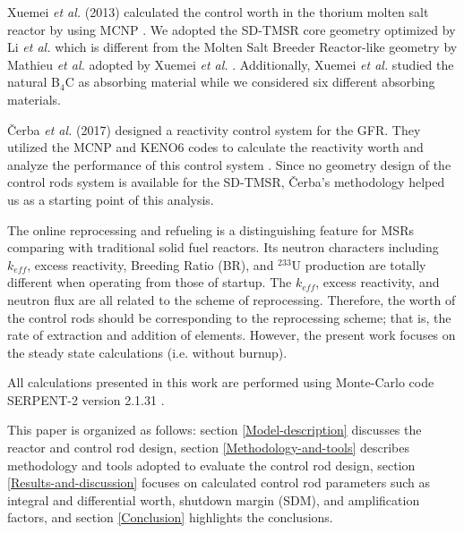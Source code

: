 Xuemei \emph{et al.} (2013) calculated the control worth in the thorium molten salt
reactor by using MCNP \cite{briesmeister2000mcnptm}. We adopted the SD-TMSR
core geometry optimized by Li \emph{et al.} \cite{li_optimization_2018} which
is different from the Molten Salt Breeder Reactor-like geometry by Mathieu \emph{et al.}
\cite{mathieu2006thorium} adopted by Xuemei \emph{et al.} \cite{xuemei2013study}.
Additionally, Xuemei \emph{et al.} studied the natural B$_4$C as absorbing material
while we considered six different absorbing materials.

\v{C}erba \emph{et al.} (2017) designed a reactivity control system for the 
GFR. They utilized the MCNP \cite{briesmeister2000mcnptm} and KENO6 codes 
\cite{petrie1984keno} to calculate the reactivity worth and analyze the 
performance of this control system \cite{vcerba2017optimization}. Since no
geometry design of the control rods system is available for the SD-TMSR, 
\v{C}erba's methodology \cite{vcerba2017optimization} helped us as a starting 
point of this analysis.

The online reprocessing and refueling is a distinguishing feature for MSRs comparing with traditional solid fuel reactors. Its neutron characters including $k_{eff}$, excess reactivity, Breeding Ratio (BR), and $^{233}$U production are totally different when operating from those of startup. The $k_{eff}$, excess reactivity, and neutron flux are all related to the scheme of reprocessing. Therefore, the worth of the control rods should be corresponding to the reprocessing scheme; that is, the rate of extraction and addition of elements. However, the present work focuses on the steady state calculations (i.e. without burnup).

All calculations presented in this work are performed using Monte-Carlo code SERPENT-2 version 2.1.31 \cite{leppanen2014serpent}.

This paper is organized as follows: section \ref{Model-description} discusses the reactor and control rod design, section \ref{Methodology-and-tools} describes methodology and tools adopted to evaluate the control rod design, section \ref{Results-and-discussion} focuses on calculated control rod parameters such as integral and differential worth, shutdown margin (SDM), and amplification factors, and section \ref{Conclusion} highlights the conclusions.